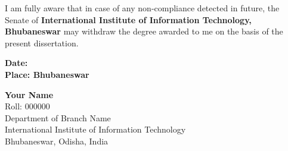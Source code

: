 I am fully aware that in case of any non-compliance detected in future, the Senate of {\bf International Institute of Information Technology, Bhubaneswar} may withdraw the degree awarded to me on the basis of the present dissertation.


\begin{flushleft}
	\fontsize{10}{10}
	\selectfont
		\textbf{Date: }\\
		\textbf{Place: Bhubaneswar}\\
\end{flushleft}


\begin{flushright}
	\fontsize{12}{10}
	\selectfont
		\textbf{Your Name}\\
	\fontsize{10}{10}
	\selectfont
		Roll: 000000\\
		Department of Branch Name\\
		International Institute of Information Technology\\
		Bhubaneswar, Odisha, India
		
\end{flushright}


